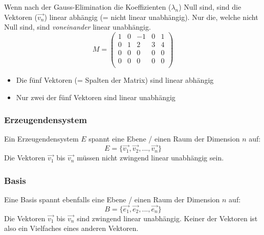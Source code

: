 Wenn nach der Gauss-Elimination die Koeffizienten ($\lambda_n$) Null sind, sind die
Vektoren ($\vec{v_n}$) linear abhängig (= nicht linear unabhängig). Nur die, welche nicht Null sind, sind \emph{voneinander} linear unabhängig.
\[ M = \begin {pmatrix}
  1  &  0  &  -1  &  0  &  1  \\
  0  &  1  &   2  &  3  &  4  \\
  0  &  0  &   0  &  0  &  0  \\
  0  &  0  &   0  &  0  &  0  \\
\end {pmatrix} \]
\begin{itemize}
  \item Die fünf Vektoren (= Spalten der Matrix) sind linear abhängig
  \item Nur zwei der fünf Vektoren sind linear unabhängig
\end{itemize}

\subsubsection{Erzeugendensystem}
Ein Erzeugendensystem $E$ spannt eine Ebene / einen Raum der
Dimension $n$ auf:
\[ E = \{ \vec{v_1}, \vec{v_2}, ..., \vec{v_n}\} \]
Die Vektoren $\vec{v_1}$ bis $\vec{v_n}$ müssen nicht zwingend linear
unabhängig sein.

\subsubsection{Basis}
Eine Basis spannt ebenfalls eine Ebene / einen Raum der Dimension $n$
auf:
\[ B = \{ \vec{e_1}, \vec{e_2}, ..., \vec{e_n}\} \]
Die Vektoren $\vec{v_1}$ bis $\vec{v_n}$ sind zwingend linear
unabhängig. Keiner der Vektoren ist also ein Vielfaches eines anderen
Vektoren.

